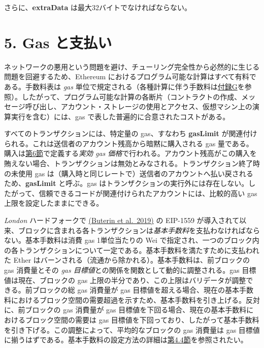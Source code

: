 \documentclass[
]{ltjsarticle}
\begin{document}
さらに、\textbf{extraData} は最大32バイトでなければならない。

\protect\hypertarget{ch:payment}{}{}

\hypertarget{gas-ux3068ux652fux6255ux3044}{%
\section{5. Gas と支払い}\label{gas-ux3068ux652fux6255ux3044}}

ネットワークの悪用という問題を避け、チューリング完全性から必然的に生じる問題を回避するため、Ethereum
におけるプログラム可能な計算はすべて有料である。手数料表は \emph{gas}
単位で規定される（各種計算に伴う手数料は\protect\hyperlink{app:fees}{付録G}を参照）。したがって、プログラム可能な計算の各断片（コントラクトの作成、メッセージ呼び出し、アカウント・ストレージの使用とアクセス、仮想マシン上の演算実行を含む）には、gas
で表した普遍的に合意されたコストがある。

すべてのトランザクションには、特定量の gas、すなわち \textbf{gasLimit}
が関連付けられる。これは送信者のアカウント残高から暗黙に購入される gas
量である。購入は\protect\hyperlink{ch:transactions}{第6節}で定義する\emph{実効
gas
価格}で行われる。アカウント残高がこの購入を賄えない場合、トランザクションは無効とみなされる。トランザクション終了時の未使用
gas
は（購入時と同じレートで）送信者のアカウントへ払い戻されるため、\textbf{gasLimit}
と呼ぶ。gas
はトランザクションの実行外には存在しない。したがって、信頼できるコードが関連付けられたアカウントには、比較的高い
gas 上限を設定したままにできる。

\emph{London} ハードフォークで \protect\hyperlink{ref-EIP-1559}{(Buterin
et al.~2019)} の EIP-1559
が導入されて以来、ブロックに含まれる各トランザクションは\emph{基本手数料}を支払わなければならない。基本手数料は消費
gas 1単位当たりの Wei
で指定され、一つのブロック内の各トランザクションについて一定である。基本手数料を満たすために支払われた
Ether はバーンされる（流通から除かれる）。基本手数料は、前ブロックの gas
消費量とその \emph{gas 目標値}との関係を関数として動的に調整される。gas
目標値は現在、ブロックの gas
上限の半分であり、この上限はバリデータが調整できる。前ブロックの総 gas
消費量が gas
目標値を超える場合、現在の基本手数料におけるブロック空間の需要超過を示すため、基本手数料を引き上げる。反対に、前ブロックの
gas 消費量が gas
目標値を下回る場合、現在の基本手数料におけるブロック空間の需要は gas
目標値を下回っており、したがって基本手数料を引き下げる。この調整によって、平均的なブロックの
gas 消費量は gas
目標値に揃うはずである。基本手数料の設定方法の詳細は\protect\hyperlink{subsec:The_Block}{第4.4節}を参照されたい。
\end{document}
